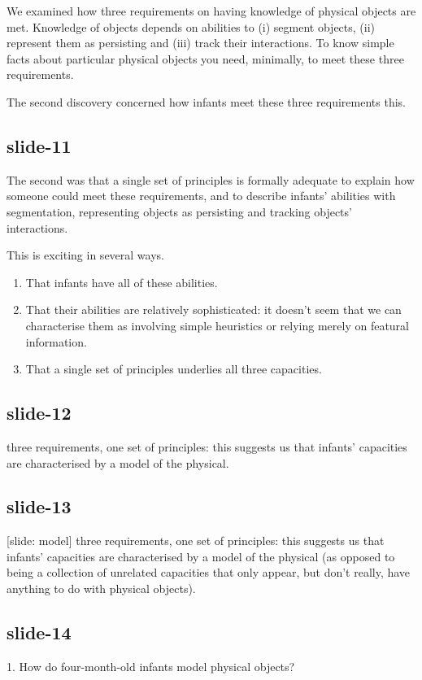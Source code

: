 \documentclass[12pt,\papersize]{extarticle}
\begin{document}
We examined how three requirements on having knowledge of physical objects are met.
Knowledge of objects depends on abilities to (i) segment objects, (ii) represent them as
persisting and (iii) track their interactions.
To know simple facts about particular physical objects you need, minimally,
to meet these three requirements.

The second discovery concerned how infants meet these three requirements this.

\subsection{slide-11}
The second was that a single set of principles is formally adequate to
explain how someone could meet these requirements, and to describe
infants' abilities with segmentation, representing objects as persisting
and tracking objects' interactions.

This is exciting in several ways.
\begin{enumerate}
\item That infants have all of these abilities.
\item That their abilities are relatively sophisticated: it doesn’t seem
that we can characterise them as involving simple heuristics or relying
merely on featural information.
\item That a single set of principles underlies all three capacities.
\end{enumerate}

\subsection{slide-12}
three requirements, one set of principles: this suggests us that infants’
capacities are characterised by a model of the physical.

\subsection{slide-13}
[slide: model]
three requirements, one set of principles: this suggests us that infants’
capacities are characterised by a model of the physical (as opposed to
being a collection of unrelated capacities that only appear, but don’t
really, have anything to do with physical objects).

\subsection{slide-14}
1. How do four-month-old infants  model  physical objects?
\end{document}
